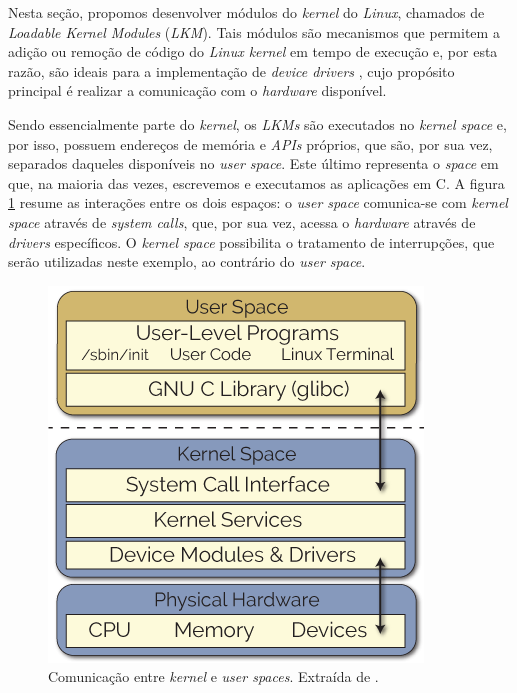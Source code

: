 Nesta seção, propomos desenvolver módulos do
\textit{kernel} do \textit{Linux}, chamados de \textit{Loadable Kernel Modules} (\textit{LKM}).
Tais módulos são mecanismos que permitem a adição ou remoção de código do \textit{Linux kernel}
em tempo de execução e, por esta razão, são ideais para a implementação de
\textit{device drivers} \cite{derek}, cujo propósito principal é realizar a
comunicação com o \textit{hardware} disponível.  

\vspace{12pt}

Sendo essencialmente parte do \textit{kernel}, os \textit{LKMs} são executados
no \textit{kernel space} e, por isso, possuem endereços de memória e
\textit{APIs} próprios, que são, por sua vez, separados daqueles
disponíveis no \textit{user space}. Este último representa o \textit{space} em
que, na maioria das vezes, escrevemos e executamos as aplicações em C. A figura
\ref{fig:derek_kernel_user} resume as interações entre os dois espaços: o
\textit{user space} comunica-se com \textit{kernel space} através de
\textit{system calls}, que, por sua vez, acessa o \textit{hardware} através de
\textit{drivers} específicos. O \textit{kernel space} possibilita o tratamento
de interrupções, que serão utilizadas neste exemplo, ao contrário do
\textit{user space}.

\begin{figure}[h]

\centering
\includegraphics[scale=0.45]{image/userspace-kernelspace}
\caption {Comunicação entre \textit{kernel} e \textit{user spaces}. Extraída de
\cite{derek}.}
\label{fig:derek_kernel_user}
\end{figure}

